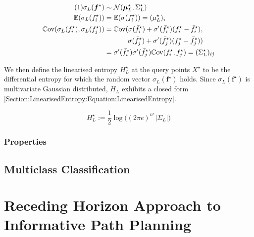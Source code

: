 \documentclass{article}
\renewcommand{\vec}[1]{\boldsymbol{#1}}
\newcommand\numberthis{\addtocounter{equation}{1}\tag{\theequation}}
\begin{document}
			\begin{align*}
			\numberthis \label{Section:LinearisedEntropy:Equation:MomentsLinearisedSigmoid}
					\sigma_{L}(\vec{f}^{\star}) & \sim \mathcal{N}(\vec{\mu}^{\star}_{L}, \Sigma^{\star}_{L}) \\
					\mathbb{E}(\sigma_{L}(f^{\star}_{i})) & = \mathbb{E}(\sigma(f^{\star}_{i})) = ({\mu^{\star}_{L}})_{i} \\
					\mathbb{C}\mathrm{ov}(\sigma_{L}(f^{\star}_{i}), \sigma_{L}(f^{\star}_{j})) & =  \mathbb{C}\mathrm{ov}(\sigma(\bar{f}^{\star}_{i}) + \sigma'(\bar{f}^{\star}_{i}) (f^{\star}_{i} - \bar{f}^{\star}_{i}),\\ 
					& \qquad \;\;\;\;\; \sigma(\bar{f}^{\star}_{j}) + \sigma'(\bar{f}^{\star}_{j}) (f^{\star}_{j} - \bar{f}^{\star}_{j})) \\
					& = \sigma'(\bar{f}^{\star}_{i}) \sigma'(\bar{f}^{\star}_{j}) \mathbb{C}\mathrm{ov}(f^{\star}_{i}, f^{\star}_{j}) = ({\Sigma^{\star}_{L}})_{ij}			
			\end{align*}
			
			We then define the linearised entropy $H^{\star}_{L}$ at the query points $X^{\star}$ to be the differential entropy for which the random vector $\sigma_{L}(\vec{f}^{\star})$ holds. Since $\sigma_{L}(\vec{f}^{\star})$ is multivariate Gaussian distributed, $H_{L}$ exhibits a closed form \eqref{Section:LinearisedEntropy:Equation:LinearisedEntropy}.
			
			\begin{equation}
				H^{\star}_{L} := \frac{1}{2} \log\Big((2 \pi e)^{n^{\star}} |\Sigma_{L}|\Big)
			\label{Section:LinearisedEntropy:Equation:LinearisedEntropy}
			\end{equation}			
				
		\subsubsection{Properties}
		
			
		
	\subsection{Multiclass Classification}
	
\section{Receding Horizon Approach to Informative Path Planning}
\label{Section:RecedingHorizonApproach}
\end{document}
